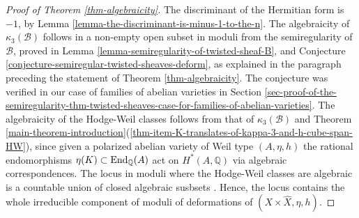 \documentclass[12pt]{amsart}
\numberwithin{equation}{subsection}
\theoremstyle{plain}
\theoremstyle{definition}
\newcommand{\B}{{\mathcal B}}
\newcommand{\QQ}{{\mathbb Q}}
\newcommand{\End}{{\rm End}}
\begin{document}
\begin{proof}[Proof of Theorem \ref{thm-algebraicity}]
The discriminant of the Hermitian form is $-1$, by Lemma \ref{lemma-the-discriminant-is-minus-1-to-the-n}.
The algebraicity of $\kappa_3(\B)$ follows in a non-empty open subset in moduli from the semiregularity of $\B$, proved in Lemma \ref{lemma-semiregularity-of-twisted-sheaf-B}, and Conjecture \ref{conjecture-semiregular-twisted-sheaves-deform}, as explained in the paragraph preceding the statement of Theorem \ref{thm-algebraicity}. The conjecture was verified in our case of families of abelian varieties in Section 
\ref{sec-proof-of-the-semiregularity-thm-twisted-sheaves-case-for-families-of-abelian-varieties}.
The algebraicity of the Hodge-Weil classes follows from that of $\kappa_3(\B)$ and Theorem \ref{main-theorem-introduction}(\ref{thm-item-K-translates-of-kappa-3-and-h-cube-span-HW}), since given a polarized abelian variety of Weil type $(A,\eta,h)$ the rational endomorphisms $\eta(K)\subset \End_\QQ(A)$
act on $H^*(A,\QQ)$ via algebraic correspondences. 
The locus in moduli where the Hodge-Weil classes are algebraic is a countable union of closed algebraic susbsets \cite[Sec. 4.2]{voisin}. Hence, the locus contains the whole irreducible component of moduli of deformations of $(X\times\hat{X},\eta,h)$.
\end{proof}
\end{document}
